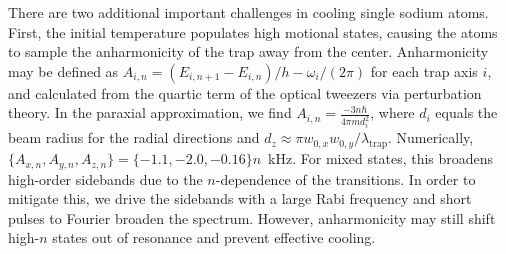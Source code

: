 \documentclass[aps,prl,twocolumn,groupedaddress]{revtex4-1}
\begin{document}
There are two additional important challenges in cooling single sodium atoms.
First, the  initial temperature populates high motional states,
causing the atoms to sample the anharmonicity of the trap away from the center. Anharmonicity may be defined as $A_{i,n}=(E_{i,n+1}-E_{i,n})/h - \omega_i/(2\pi)$ for each trap axis $i$, and calculated from the quartic term of the optical tweezers via perturbation theory.
In the paraxial approximation, we find $A_{i,n}=\frac{-3n\hbar}{4\pi m d_i^2}$, where $d_i$ equals the beam radius for the radial directions and $d_z\approx\pi w_{0,x}w_{0,y}/\lambda_{\textrm{trap}}$.
Numerically, $\{A_{x,n},A_{y,n},A_{z,n}\}=\{-1.1, -2.0, -0.16\}n$~kHz. For mixed states, this  broadens high-order sidebands due to the $n$-dependence of the transitions.
In order to mitigate this, we drive the sidebands with a large  Rabi frequency
and short pulses to Fourier broaden the spectrum. %
However, anharmonicity  may still shift high-$n$ states out of resonance and prevent effective cooling.

\end{document}
